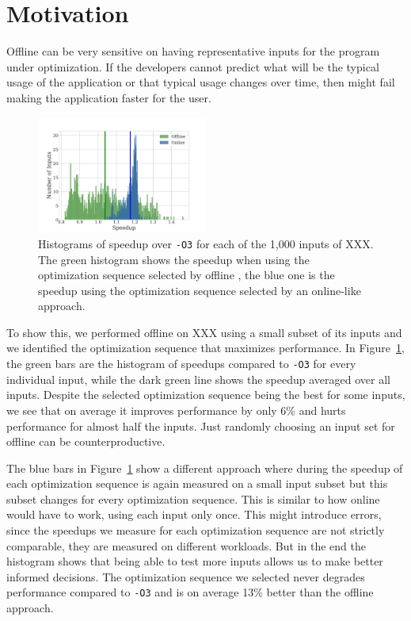 \section{Motivation}

Offline \itercomp can be very sensitive on having representative inputs for the program under optimization. If the developers cannot
predict what will be the typical usage of the application or that typical usage changes over time, then \itercomp might fail making the
application faster for the user.

\begin{figure}[t!]
    \centering
    \includegraphics[width=0.5\textwidth]{figs/motivation-online.pdf}
    \caption{Histograms of speedup over \texttt{-O3} for each of the 1,000 inputs of XXX. The green histogram shows the speedup when using
    the optimization sequence selected by offline \itercomp, the blue one is the speedup using the optimization sequence selected by an
    online-like approach.}
    \label{fig:motivation-online}
\end{figure}

To show this, we performed offline \itercomp on XXX using a small subset of its inputs and we identified the optimization sequence that
maximizes performance. In Figure~\ref{fig:motivation-online}, the green bars are the histogram of speedups compared to \texttt{-O3} for
every individual input, while the dark green line shows the speedup averaged over all inputs. Despite the selected optimization sequence
being the best for some inputs, we see that on average it improves performance by only 6\% and hurts performance for almost half the
inputs. Just randomly choosing an input set for offline \itercomp can be counterproductive.

The blue bars in Figure~\ref{fig:motivation-online} show a different approach where during \itercomp the speedup of each optimization
sequence is again measured on a small input subset but this subset changes for every optimization sequence. This is similar to how online
\itercomp would have to work, using each input only once. This might introduce errors, since the speedups we measure for each optimization
sequence are not strictly comparable, they are measured on different workloads. But in the end the histogram shows that being able to test
more inputs allows us to make better informed decisions. The optimization sequence we selected never degrades performance compared to
\texttt{-O3} and is on average 13\% better than the offline approach.

